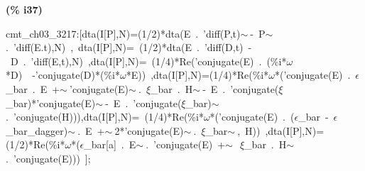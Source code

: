 \documentclass[fleqn]{article}
\begin{document}
\noindent
\begin{minipage}[t]{4.000000em}\color{red}\bfseries
(\% i37)	
\end{minipage}
\begin{minipage}[t]{\textwidth}\color{blue}
cmt\_ch03\_3217:[dta(I[P],N)=(1/2)*dta(E\ .\ 'diff(P,t)\ensuremath{\sim\ }-\ P\ensuremath{\sim\ }.\ 'diff(E.t),N)\ ,\ dta(I[P],N)=\ (1/2)*dta(E\ .\ 'diff(D,t)\ -\ D\ .\ 'diff(E,t),N)\ ,dta(I[P],N)=\ (1/4)*Re('conjugate(E)\ .\ (\%i*\ensuremath{\omega}*D)\ \ -'conjugate(D)*(\%i*\ensuremath{\omega}*E))\ ,dta(I[P],N)=(1/4)*Re(\%i*\ensuremath{\omega}*('conjugate(E)\ .\ \ensuremath{\epsilon}\_bar\ .\ E\ +\ensuremath{\sim\ }'conjugate(E)\ensuremath{\sim\ }.\ \ensuremath{\xi}\_bar\ .\ H\ensuremath{\sim\ }-\ E\ .\ 'conjugate(\ensuremath{\xi}\_bar)*'conjugate(E)\ensuremath{\sim\ }-\ E\ .\ 'conjugate(\ensuremath{\xi}\_bar)\ensuremath{\sim\ }.\ 'conjugate(H))),dta(I[P],N)=\ (1/4)*Re(\%i*\ensuremath{\omega}*('conjugate(E)\ .\ (\ensuremath{\epsilon}\_bar\ -\ \ensuremath{\epsilon}\_bar\_dagger)\ensuremath{\sim\ }.\ E\ +\ensuremath{\sim\ }2*'conjugate(E)\ensuremath{\sim\ }.\ \ensuremath{\xi}\_bar\ensuremath{\sim\ },\ H))\ ,dta(I[P],N)=(1/2)*Re(\%i*\ensuremath{\omega}*(\ensuremath{\epsilon}\_bar[a]\ .\ E\ensuremath{\sim\ }.\ 'conjugate(E)\ +\ensuremath{\sim\ }\ \ensuremath{\xi}\_bar\ .\ H\ensuremath{\sim\ }.\ 'conjugate(E)))\ ];
\end{minipage}
\end{document}
